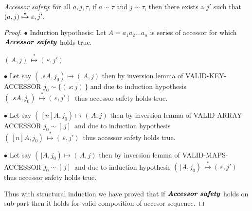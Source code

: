 \documentclass[11pt]{article}
\newcommand{\matches}[2]{{#1}\sim{#2}}   %
\newcommand{\aeps}{\varepsilon}          %
\begin{document}
\textit{Accessor safety}: for all $a, j, \tau$, if $\matches{a}{\tau}$ and $\matches{j}{\tau}$, then there exists a $j'$ such that $\evals{(a, j)}{\aeps, j'}$.

\begin{proof}
$\bullet$ Induction hypothesis: Let ${A = a_1 a_2 ... a_n}$ is series of accessor  for which $\textbf{\emph{Accessor safety}}$ holds true.


$(\, A, j)\, \overset{*}{\mapsto} (\, \aeps, j')\,$

$\bullet$ Let say $(\, .sA, j_0) \mapsto (\, A, j) $ then by inversion lemma of VALID-KEY-ACCESSOR $\matches{j_0}{ \{(\,s:j)\,\}} $ and due to induction hypothesis 
$(\, .sA, j_0)\, \overset{*}{\mapsto} (\, \aeps, j')\,$ thus accessor safety holds true.

$\bullet$ Let say $(\, [n]A, j_0) \mapsto (\, A, j) $ then by inversion lemma of VALID-ARRAY-ACCESSOR $\matches{j_0}{ [\, j ]\,} $ and due to induction hypothesis 
$(\, [n]A, j_0)\, \overset{*}{\mapsto} (\, \aeps, j')\,$ thus accessor safety holds true.

$\bullet$ Let say $(\, |A, j_0) \mapsto (\, A, j) $ then by inversion lemma of VALID-MAPS-ACCESSOR $\matches{j_0}{ [\, j ]\,} $ and due to induction hypothesis 
$(\, |A, j_0)\, \overset{*}{\mapsto} (\, \aeps, j')\,$ thus accessor safety holds true.

Thus with structural induction we have proved that if $\textbf{\emph{Accessor safety}}$ holds on sub-part then it holds for valid composition of accesor sequence.





\end{proof}
\end{document}
